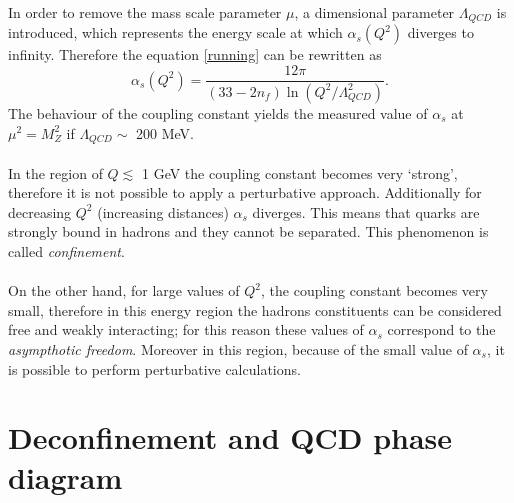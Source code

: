 \documentclass[b5paper,10pt,twoside,oldstyle,classica]{toptesi}
\begin{document}
In order to remove the mass scale parameter $\mu$, a dimensional parameter $\Lambda_{QCD}$ is introduced, which represents the energy scale at which $\alpha_s(Q^2)$ diverges to infinity. Therefore the equation \ref{running} can be rewritten as
\begin{equation}
 \alpha_s(Q^2) = \frac{12\pi}{(33-2n_f)\ln{(Q^2/\Lambda_{QCD}^2)}}.
\label{running2}
 \end{equation}
The behaviour of the coupling constant yields the measured value of $\alpha_s$ at $\mu^2 = M_Z^2$ if $\Lambda_{QCD} \sim$ 200 MeV.\\\\
In the region of $Q \lesssim $ 1 GeV  the coupling constant becomes very `strong', therefore it is not possible to apply a perturbative approach. Additionally for decreasing $Q^2$ (increasing distances) $\alpha_s$ diverges. This means that quarks are strongly bound in hadrons and they cannot be separated. This phenomenon is called \textit{confinement}. \\\\
On the other hand, for large values of $Q^2$, the coupling constant becomes very small, therefore in this energy region the hadrons constituents can be considered free and weakly interacting; for this reason these values of $\alpha_s$ correspond to the \textit{asympthotic freedom}.
Moreover in this region, because of the small value of $\alpha_s$, it is possible to perform perturbative calculations.
\section{Deconfinement and QCD phase diagram}
\end{document}
